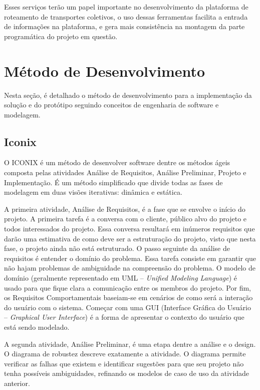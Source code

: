 Esses serviços terão um papel importante no desenvolvimento da plataforma de roteamento de transportes coletivos, o uso dessas ferramentas facilita a entrada de informações na plataforma, e gera mais consistência na montagem da parte programática do projeto em questão.

\section{Método de Desenvolvimento}
\label{metodo-desenvolvimento}
Nesta seção, é detalhado o método de desenvolvimento para a implementação da solução e do protótipo seguindo conceitos de engenharia de software e modelagem.

\subsection{Iconix}
O ICONIX é um método de desenvolver software dentre os métodos ágeis composta pelas atividades Análise de Requisitos, Análise Preliminar, Projeto e Implementação. É um método simplificado que divide todas as fases de modelagem em duas visões iterativas: dinâmica e estática. 

A primeira atividade, Análise de Requisitos, é a fase que se envolve o início do projeto. A primeira tarefa é a conversa com o cliente, público alvo do projeto e todos interessados do projeto. Essa conversa resultará em inúmeros requisitos que darão uma estimativa de como deve ser a estruturação do projeto, visto que nesta fase, o projeto ainda não está estruturado.
O passo seguinte da análise de requisitos é entender o domínio do problema. Essa tarefa consiste em garantir que não hajam problemas de ambiguidade na compreensão do problema. O modelo de domínio (geralmente representado em UML -- \emph{Unified Modeling Language}) é usado para que fique clara a comunicação entre os membros do projeto.
Por fim, os Requisitos Comportamentais baseiam-se em cenários de como será a interação do usuário com o sistema. Começar com uma GUI (Interface Gráfica do Usuário -- \emph{Graphical User Interface}) é a forma de apresentar o contexto do usuário que está sendo modelado.

A segunda atividade, Análise Preliminar, é uma etapa dentre a análise e o design. O diagrama de robustez descreve exatamente a atividade. O diagrama permite verificar as falhas que existem e identificar sugestões para que seu projeto não tenha possíveis ambiguidades, refinando os modelos de caso de uso da atividade anterior.

